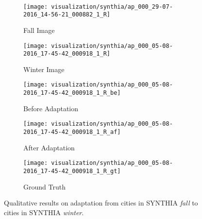 \documentclass[10pt,twocolumn,letterpaper]{article}
\begin{document}
\begin{figure*}[t!]
\begin{subfigure}[t]{0.196\linewidth}
	\end{subfigure}
	\hfill
	\\
	\centering
	\begin{subfigure}[t]{0.196\linewidth}
		\centering
		\texttt{[image: visualization/synthia/ap\_000\_29-07-2016\_14-56-21\_000882\_1\_R]}
		\caption{Fall Image}
	\end{subfigure}
	\hfill
	\begin{subfigure}[t]{0.196\linewidth}
		\centering
		\texttt{[image: visualization/synthia/ap\_000\_05-08-2016\_17-45-42\_000918\_1\_R]}
		\caption{Winter Image}
	\end{subfigure}
	\hfill
	\begin{subfigure}[t]{0.196\linewidth}
		\centering
		\texttt{[image: visualization/synthia/ap\_000\_05-08-2016\_17-45-42\_000918\_1\_R\_be]}
		\caption{Before Adaptation}
	\end{subfigure}
	\hfill
	\begin{subfigure}[t]{0.196\linewidth}
		\centering
		\texttt{[image: visualization/synthia/ap\_000\_05-08-2016\_17-45-42\_000918\_1\_R\_af]}
		\caption{After Adaptation}
	\end{subfigure}
	\hfill
	\begin{subfigure}[t]{0.196\linewidth}
		\centering
		\texttt{[image: visualization/synthia/ap\_000\_05-08-2016\_17-45-42\_000918\_1\_R\_gt]}
		\caption{Ground Truth}
	\end{subfigure}
	\hfill
\caption{Qualitative results on adaptation from cities in SYNTHIA \textit{fall} to cities in SYNTHIA \textit{winter}.}
	\label{fig:season2season}
    \vspace{-1mm}
\end{figure*}
\end{document}
